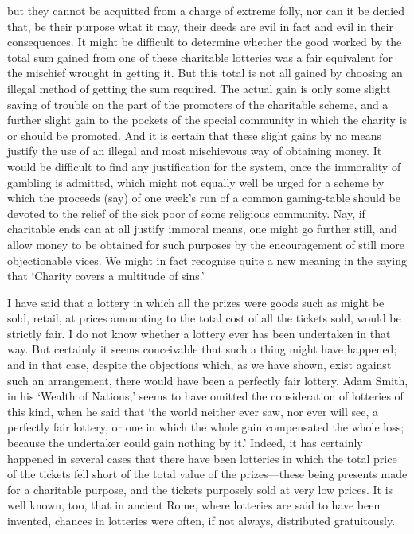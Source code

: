 \documentclass[letterpaper,12pt,oneside,openany]{memoir}
\begin{document}
but they cannot be acquitted from a charge of extreme
folly, nor can it be denied that, be their purpose what it
may, their deeds are evil in fact and evil in their consequences.
It might be difficult to determine whether
the good worked by the total sum gained from one of
these charitable lotteries was a fair equivalent for the
mischief wrought in getting it. But this total is not
all gained by choosing an illegal method of getting the
sum required. The actual gain is only some slight
saving of trouble on the part of the promoters of the
charitable scheme, and a further slight gain to the
pockets of the special community in which the charity
is or should be promoted. And it is certain that these
slight gains by no means justify the use of an illegal
and most mischievous way of obtaining money. It
would be difficult to find any justification for the
system, once the immorality of gambling is admitted,
which might not equally well be urged for a scheme by
which the proceeds (say) of one week's run of a common
gaming-table should be devoted to the relief of
the sick poor of some religious community. Nay, if
charitable ends can at all justify immoral means, one
might go further still, and allow money to be obtained
for such purposes by the encouragement of still more
objectionable vices. We might in fact recognise quite
a new meaning in the saying that `Charity covers a
multitude of sins.'


I have said that a lottery in which all the prizes
were goods such as might be sold, retail, at prices
amounting to the total cost of all the tickets sold, would
be strictly fair. I do not know whether a lottery ever
has been undertaken in that way. But certainly it
seems conceivable that such a thing might have happened;
and in that case, despite the objections which,
as we have shown, exist against such an arrangement,
there would have been a perfectly fair lottery.
Adam Smith, in his `Wealth of Nations,' seems to have
omitted the consideration of lotteries of this kind, when
he said that `the world neither ever saw, nor ever will
see, a perfectly fair lottery, or one in which the whole
gain compensated the whole loss; because the undertaker
could gain nothing by it.' Indeed, it has
certainly happened in several cases that there have been
lotteries in which the total price of the tickets fell short
of the total value of the prizes---these being presents
made for a charitable purpose, and the tickets purposely
sold at very low prices. It is well known, too, that in
ancient Rome, where lotteries are said to have been
invented, chances in lotteries were often, if not always,
distributed gratuitously.
\end{document}
